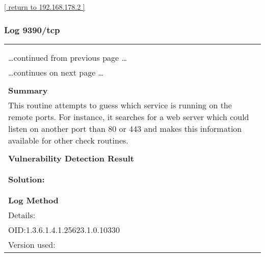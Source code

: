 \documentclass{article}
\begin{document}
\begin{footnotesize}\hyperref[host:192.168.178.2]{[ return to 192.168.178.2 ]}\end{footnotesize}
\subsubsection{Log 9390/tcp}
\label{port:192.168.178.2 9390/tcp Log}

\begin{longtable}{|p{}|}
\hline
\rowcolor{gvm_log}{\color{white}{Log (CVSS: 0.0) }}\\
\rowcolor{gvm_log}{\color{white}{NVT: Services}}\\
\hline
\endfirsthead
\hfill\ldots continued from previous page \ldots \\
\hline
\endhead
\hline
\ldots continues on next page \ldots \\
\endfoot
\hline
\endlastfoot
\\
\textbf{Summary}\\
This routine attempts to guess which service is running on the
  remote ports. For instance, it searches for a web server which could listen on another port than
  80 or 443 and makes this information available for other check routines.\\

        \hline
        \\
\textbf{Vulnerability Detection Result}\\
\rowcolor{white}{\verb=A TLScustom server answered on this port=}\\

          \hline
          \\
\textbf{Solution:}\\
\\


        \hline
        \\
\textbf{Log Method}\\
Details:
\rowcolor{white}{\verb=Services=}\\
OID:1.3.6.1.4.1.25623.1.0.10330\\
Version used:
\rowcolor{white}{\verb=2021-03-15T10:42:03Z=}\\
\end{longtable}
\end{document}
